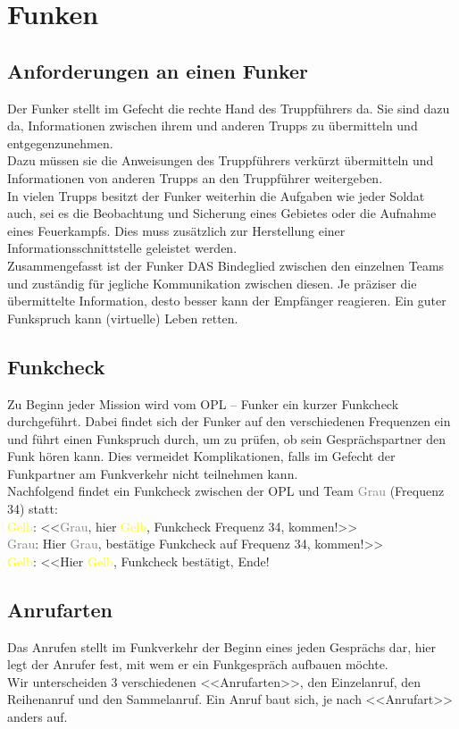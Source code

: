 \newpage
\section{Funken}
\label{Funken}
\subsection{Anforderungen an einen Funker}
Der Funker stellt im Gefecht die rechte Hand des Truppführers da. Sie sind dazu da,
Informationen zwischen ihrem und anderen Trupps zu übermitteln und
entgegenzunehmen. \\
Dazu müssen sie die Anweisungen des Truppführers verkürzt
übermitteln und Informationen von anderen Trupps an den Truppführer weitergeben. \\
In vielen Trupps besitzt der Funker weiterhin die Aufgaben wie jeder Soldat auch, sei es
die Beobachtung und Sicherung eines Gebietes oder die Aufnahme eines Feuerkampfs.
Dies muss zusätzlich zur Herstellung einer Informationsschnittstelle geleistet werden. \\
Zusammengefasst ist der Funker DAS Bindeglied zwischen den einzelnen Teams und
zuständig für jegliche Kommunikation zwischen diesen. Je präziser die übermittelte
Information, desto besser kann der Empfänger reagieren. Ein guter Funkspruch kann
(virtuelle) Leben retten. \\

\subsection{Funkcheck}
Zu Beginn jeder Mission wird vom OPL – Funker ein kurzer Funkcheck durchgeführt.
Dabei findet sich der Funker auf den verschiedenen Frequenzen ein und führt einen
Funkspruch durch, um zu prüfen, ob sein Gesprächspartner den Funk hören kann. Dies
vermeidet Komplikationen, falls im Gefecht der Funkpartner am Funkverkehr nicht
teilnehmen kann. \\
Nachfolgend findet ein Funkcheck zwischen der OPL und Team \textcolor{gray}{Grau} (Frequenz 34) statt: \\
\textcolor{yellow}{Gelb}: <<\textcolor{gray}{Grau}, hier \textcolor{yellow}{Gelb}, Funkcheck Frequenz 34, kommen!>> \\
\textcolor{gray}{Grau}: Hier \textcolor{gray}{Grau}, bestätige Funkcheck auf Frequenz 34, kommen!>> \\
\textcolor{yellow}{Gelb}: <<Hier \textcolor{yellow}{Gelb}, Funkcheck bestätigt, Ende! \\
\subsection{Anrufarten} 
Das Anrufen stellt im Funkverkehr der Beginn eines jeden Gesprächs dar, hier legt der
Anrufer fest, mit wem er ein Funkgespräch aufbauen möchte. \\
Wir unterscheiden 3 verschiedenen <<Anrufarten>>, den Einzelanruf, den Reihenanruf und
den Sammelanruf. Ein Anruf baut sich, je nach <<Anrufart>> anders auf. \\
